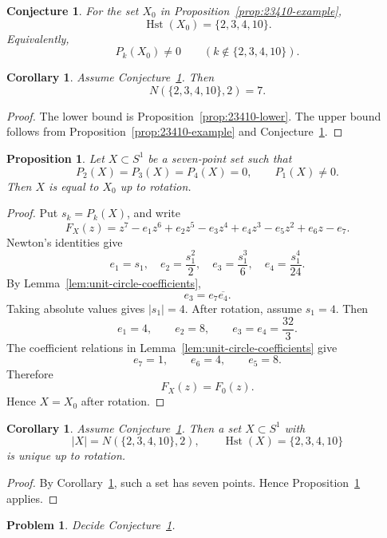 \documentclass{amsart}
\newtheorem{prop}[thm]{Proposition}
\newtheorem{cor}[thm]{Corollary}
\newtheorem{conj}[thm]{Conjecture}
\newtheorem{prob}[thm]{Problem}
\theoremstyle{definition}
\DeclareMathOperator{\Hst}{Hst}
\begin{document}
\begin{conj}\label{conj:23410}
For the set \(X_0\) in Proposition~\ref{prop:23410-example},
\[
\Hst(X_0)=\{2,3,4,10\}.
\]
Equivalently,
\[
P_k(X_0)\neq0
\qquad
(k\notin\{2,3,4,10\}).
\]
\end{conj}

\begin{cor}\label{cor:23410-conditional}
Assume Conjecture~\ref{conj:23410}. Then
\[
N(\{2,3,4,10\},2)=7.
\]
\end{cor}

\begin{proof}
The lower bound is Proposition~\ref{prop:23410-lower}.  The upper bound
follows from Proposition~\ref{prop:23410-example} and
Conjecture~\ref{conj:23410}.
\end{proof}

\begin{prop}\label{prop:23410-rigidity}
Let \(X\subset S^1\) be a seven-point set such that
\[
P_2(X)=P_3(X)=P_4(X)=0,
\qquad
P_1(X)\neq0.
\]
Then \(X\) is equal to \(X_0\) up to rotation.
\end{prop}

\begin{proof}
Put \(s_k=P_k(X)\), and write
\[
F_X(z)=z^7-e_1z^6+e_2z^5-e_3z^4+e_4z^3-e_5z^2+e_6z-e_7.
\]
Newton's identities give
\[
e_1=s_1,\quad
e_2=\frac{s_1^2}{2},\quad
e_3=\frac{s_1^3}{6},\quad
e_4=\frac{s_1^4}{24}.
\]
By Lemma~\ref{lem:unit-circle-coefficients},
\[
e_3=e_7\overline{e_4}.
\]
Taking absolute values gives \(|s_1|=4\).  After rotation, assume
\(s_1=4\).  Then
\[
e_1=4,\qquad e_2=8,\qquad e_3=e_4=\frac{32}{3}.
\]
The coefficient relations in Lemma~\ref{lem:unit-circle-coefficients} give
\[
e_7=1,\qquad e_6=4,\qquad e_5=8.
\]
Therefore
\[
F_X(z)=F_0(z).
\]
Hence \(X=X_0\) after rotation.
\end{proof}

\begin{cor}\label{cor:23410-unique-conditional}
Assume Conjecture~\ref{conj:23410}. Then a set \(X\subset S^1\) with
\[
|X|=N(\{2,3,4,10\},2),
\qquad
\Hst(X)=\{2,3,4,10\}
\]
is unique up to rotation.
\end{cor}

\begin{proof}
By Corollary~\ref{cor:23410-conditional}, such a set has seven points.
Hence Proposition~\ref{prop:23410-rigidity} applies.
\end{proof}

\begin{prob}
Decide Conjecture~\ref{conj:23410}.
\end{prob}
\end{document}
